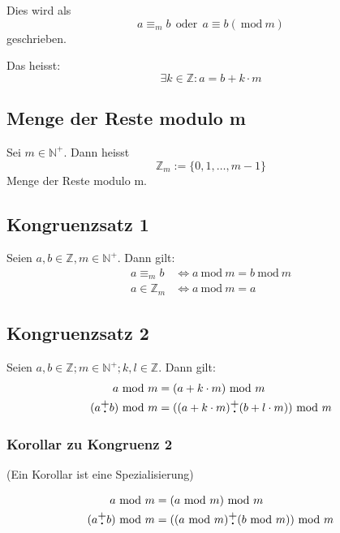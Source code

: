 \documentclass[a4paper, ngerman, landscape, fleqn]{article}
\newcommand{\Mod}{\ \mathrm{mod}\ }
\newcommand{\plusdot}{\stackanchor[1pt]{$+$}{$\boldsymbol{\cdot}$}}
\begin{document}
\begin{multicols*}{3}
Dies wird als 
\begin{equation*}
    a \equiv_m b \ \ \text{oder}\ \ a \equiv b (\Mod m)
\end{equation*}
geschrieben.

\vspace{1em}

Das heisst:
\begin{equation*}
    \exists k \in \mathbb{Z} : a = b + k \cdot m
\end{equation*}

\subsection*{Menge der Reste modulo m}

Sei $m \in \mathbb{N}^+$. Dann heisst
\begin{equation*}
    \mathbb{Z}_m := \{0,1,\dots, m - 1\}
\end{equation*}
Menge der Reste modulo m.

\subsection*{Kongruenzsatz 1}
Seien $a, b \in \mathbb{Z}, m \in \mathbb{N}^+$. Dann gilt:
\begin{align*}
    a \equiv_m b & \iff a \Mod m = b \Mod m \\
    a \in \mathbb{Z}_m & \iff a \Mod m = a
\end{align*}

\subsection*{Kongruenzsatz 2}
Seien $a, b \in \mathbb{Z}; m \in \mathbb{N}^+; k, l \in \mathbb{Z}$. Dann gilt:
\begin{align*}
    a \Mod m & = (a + k \cdot m) \Mod m \\
    (a \plusdot b) \Mod m &= ((a + k \cdot m) \plusdot (b + l \cdot m)) \Mod m
\end{align*}

\subsubsection*{Korollar zu Kongruenz 2}
(Ein Korollar ist eine Spezialisierung)

\begin{align*}
    a \Mod m &= (a \Mod m) \Mod m \\
    (a \plusdot b) \Mod m &= ((a \Mod m) \plusdot (b \Mod m)) \Mod m
\end{align*}


\end{multicols*}
\end{document}
